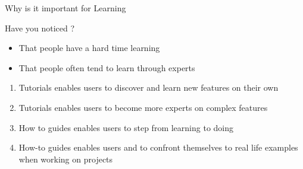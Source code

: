 \documentclass[10pt]{beamer}
\begin{document}
\begin{frame}{Why is it important for Learning}
  \begin{tcbPbl}{Have you noticed ?}
    \begin{itemize}
      \item That people have a hard time learning
      \item That people often tend to learn through experts
    \end{itemize}
  \end{tcbPbl}
  \begin{tcbProp}{}
    \begin{enumerate}
      \item Tutorials enables users to discover and learn new features on their own
      \item Tutorials enables users to become more experts on complex features
      \item How to guides enables users to step from learning to doing
      \item How-to guides enables users and to confront themselves
            to real life examples when working on projects
    \end{enumerate}
  \end{tcbProp}
\end{frame}
\end{document}
